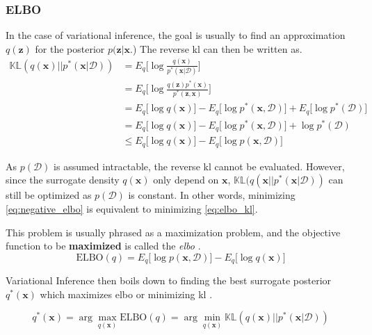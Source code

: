\subsubsection{ELBO}
In the case of variational inference, the goal is usually to find an approximation $q(\mathbf{z})$ for the posterior $p(\mathbf{z} | \mathbf{x}$.) The reverse \acrshort{kl} can then be written as.
\begin{subequations}
\begin{align}
    \mathbb{KL}(q(\mathbf{x}) || p^*(\mathbf{x} | \mathcal{D})) &= E_q\big[\log \frac{q(\mathbf{x})}{p^*(\mathbf{x} | \mathcal{D})} \big]\label{eq:elbo_kl}\\
    &= E_q\big[\log \frac{q(\mathbf{z}) p^*(\mathbf{x})}{p^*(\mathbf{z}, \mathbf{x})} \big]\\
    &= E_q\big[\log q(\mathbf{x}) \big] - E_q\big[\log p^*(\mathbf{x}, \mathcal{D})] + E_q\big[\log p^*(\mathcal{D}) \big]\\
    &= E_q\big[\log q(\mathbf{x}) \big] - E_q\big[\log p^*(\mathbf{x}, \mathcal{D})] + \log p^*(\mathcal{D})\\
    &\leq E_q\big[\log q(\mathbf{x}) \big] - E_q\big[\log p(\mathbf{x}, \mathcal{D})]\label{eq:negative_elbo}
\end{align}
\end{subequations}

As $p(\mathcal{D})$ is assumed intractable, the reverse \acrshort{kl} cannot be evaluated. However, since the surrogate density $q(\mathbf{x})$ only depend on $\mathbf{x}$, $\mathbb{KL}(q(\mathbf{x} || p^*(\mathbf{x} | \mathcal{D}))$ can still be optimized as $p(\mathcal{D})$ is constant. In other words, minimizing \cref{eq:negative_elbo} is equivalent to minimizing \cref{eq:elbo_kl}.

This problem is usually phrased as a maximization problem, and the objective function to be \textbf{maximized} is called the \textit{\acrfull{elbo}} \cite{Blei_2017}.
\begin{equation}
    \text{ELBO}(q) = E_q\big[\log p(\mathbf{x}, \mathcal{D})] - E_q\big[\log q(\mathbf{x}) \big]
\end{equation}

Variational Inference then boils down to finding the best surrogate posterior $q^*(\mathbf{x})$ which maximizes \acrshort{elbo} or minimizing \acrshort{kl} \cite{Blei_2017}.

\begin{equation}
    q^*(\mathbf{x}) = \arg \max_{q(\mathbf{x})} \text{ELBO}(q) = \arg \min_{q(\mathbf{x})} \mathbb{KL}(q(\mathbf{x}) || p^*(\mathbf{x} | \mathcal{D}))
\end{equation}



